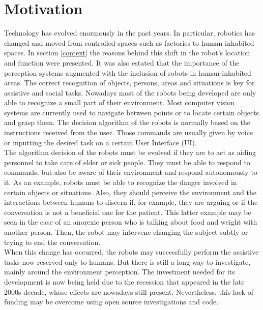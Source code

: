 
\section{Motivation}

Technology has evolved enormously in the past years. 
In particular, robotics has changed and moved from controlled spaces such as factories to human inhabited spaces. 
In section \ref{context} the reasons behind this shift in the robot's location and function were presented. 
It was also estated that the importance of the perception systems augmented with the inclusion of robots in human-inhabited areas. 
The correct recognition of objects, persons, areas and situations is key for assistive and social tasks. 
Nowadays most of the robots being developed are only able to recognize a small part of their environment. 
Most computer vision systems are currently used to navigate between points or to locate certain objects and grasp them. 
The decision algorithm of the robots is normally based on the instructions received from the user. 
Those commands are usually given by voice or inputting the desired task on a certain User Interface (UI).
\\

The algorithm decision of the robots must be evolved if they are to act as aiding personnel to take care of elder or sick people. 
They must be able to respond to commands, but also be aware of their environment and respond autonomously to it. 
As an example, robots must be able to recognize the danger involved in certain objects or situations. 
Also, they should perceive the environment and the interactions between humans to discern if, for example, they are arguing or if the conversation is not a beneficial one for the patient. 
This latter example may be seen in the case of an anorexic person who is talking about food and weight with another person. 
Then, the robot may intervene changing the subject subtly or trying to end the conversation. 
\\
When this change has occurred, the robots may successfully perform the assistive tasks now reserved only to humans. 
But there is still a long way to investigate, mainly around the environment perception. 
The investment needed for its development is now being held due to the recession that appeared in the late 2000s decade, whose effects are nowadays still present. 
Nevertheless, this lack of funding may be overcome using open source investigations and code. 

